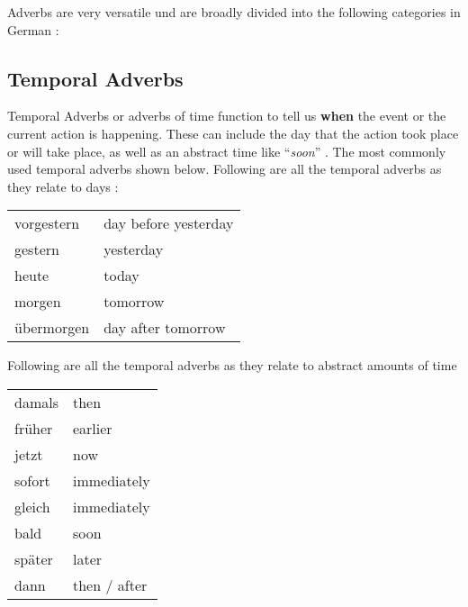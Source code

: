 \documentclass[a4paper,twocolumn,10pt]{article}
\newcommand{\newpar}
{\par \vspace{0.3cm}}
\newcommand{\tabularxtable}[3]
{

	\vspace{0.5cm}
	\nolinenumbers

	\begin{tabularx}{#1}{#2}
		#3
	\end{tabularx}

	\linenumbers
	\vspace{0.5cm}
}
\begin{document}
Adverbs are very versatile und are broadly divided into the following categories
in German :

\subsection{Temporal Adverbs}
\label{ssec:temporal_adverbs}

Temporal Adverbs or adverbs of time function to tell us \textbf {when} the event
or the current action is happening. These can include the day that the action
took place or will take place, as well as an abstract time like
``{\textit{soon}}'' . The most commonly used temporal adverbs shown below.
Following are all the temporal adverbs as they relate to days : \newpar


\tabularxtable { 0.95\linewidth  } {lX} { \rowcolor{white}      vorgestern & day
	before yesterday \\ \rowcolor{gray-light}  gestern    & yesterday \\
	\rowcolor{white}      heute      & today \\ \rowcolor{gray-light}  morgen &
	tomorrow\\ \rowcolor{white}      übermorgen & day after tomorrow\\


}


Following are all the temporal adverbs as they relate to abstract amounts of
time\newpar


\tabularxtable
{ 0.95\linewidth  }
{lX}
{
\rowcolor{white}     damals & then \\
\rowcolor{gray-light} früher & earlier \\
\rowcolor{white}     jetzt  & now \\
\rowcolor{gray-light} sofort & immediately \\
\rowcolor{white}     gleich & immediately \\
\rowcolor{gray-light} bald   & soon \\
\rowcolor{white}     später & later \\
\rowcolor{gray-light} dann   & then / after \\



}
\end{document}
